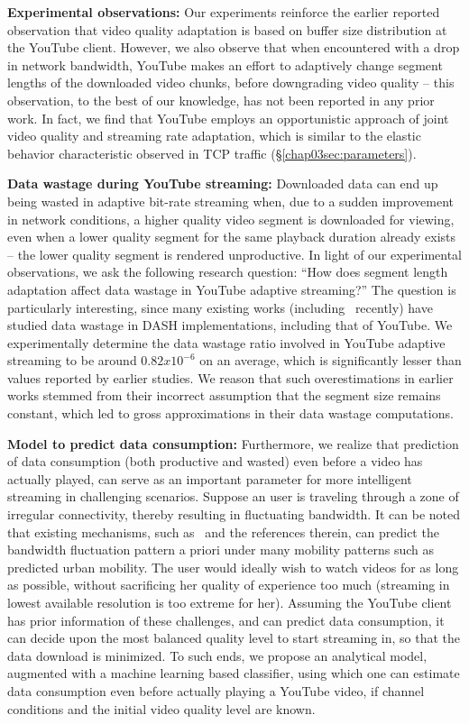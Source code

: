{\bf Experimental observations:} Our experiments reinforce the earlier reported observation that video quality adaptation is based on buffer size distribution at the YouTube client.
However, we also observe that when encountered with a drop in network bandwidth, YouTube makes an effort to adaptively change segment lengths of the downloaded video chunks, before downgrading video quality -- this observation, to the best of our knowledge, has not been reported in any prior work.
In fact, we find that YouTube employs an opportunistic approach of joint video quality and streaming rate adaptation, which is similar to the elastic behavior characteristic  observed in TCP traffic (\S\ref{chap03sec:parameters}).

{\bf Data wastage during YouTube streaming:} Downloaded data can end up being wasted in adaptive bit-rate streaming when, due to a sudden improvement in network conditions, a higher quality video segment is downloaded for viewing, even when a lower quality segment for the same playback duration already exists -- the lower quality segment is rendered unproductive.
In light of our experimental observations, we ask the following research question: ``How does segment length adaptation affect data wastage in YouTube adaptive streaming?''
The question is particularly interesting, since many existing works (including~\cite{sieber2016sacrificing} recently) have studied data wastage in DASH implementations, including that of YouTube.
We experimentally determine the data wastage ratio involved in YouTube adaptive streaming to be around $0.82x10^{-6}$ on an average, which is significantly lesser than values reported by earlier studies.%
We reason that such overestimations in earlier works stemmed from their incorrect assumption that the segment size remains constant, which led to gross approximations in their data wastage computations.

{\bf Model to predict data consumption:} Furthermore, we realize that prediction of data consumption (both productive and wasted) even before a video has actually played, can serve as an important parameter for more intelligent streaming in challenging scenarios.
Suppose an user is traveling through a zone of irregular connectivity, thereby resulting in fluctuating bandwidth. It can be noted that existing mechanisms, such as~\cite{zou2015can} and the references therein, can predict the bandwidth fluctuation pattern a priori under many mobility patterns such as predicted urban mobility.  
The user would ideally wish to watch videos for as long as possible, without sacrificing her quality of experience too much (streaming in lowest available resolution is too extreme for her). 
Assuming the YouTube client has prior information of these challenges, and can predict data consumption, it can decide upon the most balanced quality level to start streaming in, so that the data download is minimized.
To such ends, we propose an analytical model, augmented with a machine learning based classifier, using which one can estimate data consumption even before actually playing a YouTube video, if channel conditions and the initial video quality level are known.

